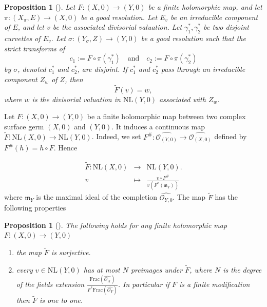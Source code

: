 \documentclass[reqno,dvipsnames,12pt]{amsart}
\newtheorem{prop}[thm]{Proposition}
\newtheorem{rema}[thm]{Remark}
\begin{document}
\begin{prop}[{\cite[Proposition 5.7]{yenni1}}]\label{imagedivisorialvaluation}
Let $F:(X,0) \to (Y,0)$ be a finite holomorphic map, and let $\pi:(X_\pi,E)\to (X,0)$ be a good resolution. Let $E_v$ be an irreducible component of $E$, and let $v$ be the associated divisorial valuation. Let $\gamma_1^*,\gamma_2^*$ be two disjoint curvettes of $E_v$. Let $\sigma:(Y_\sigma,Z)\to (Y,0)$ be a good resolution such that the strict transforms of
\[
c_1 := F \circ \pi(\gamma_1^*) \quad\text{and}\quad c_2 := F \circ \pi(\gamma_2^*)
\]
by $\sigma$, denoted $c_1^*$ and $c_2^*$, are disjoint. If $c_1^*$ and $c_2^*$ pass through an irreducible component $Z_w$ of $Z$, then
\[
\widetilde{F}(v) = w,
\]
where $w$ is the divisorial valuation in $\mathrm{NL}(Y,0)$ associated with $Z_w$.
\end{prop}

    
 Let $F: (X,0) \longrightarrow (Y,0)$ be a finite holomorphic map between two complex surface germ $(X,0)$ and $(Y,0)$. It induces a continuous map $\widetilde{F} : \mathrm{NL}(X,0) \longrightarrow \mathrm{NL}(Y,0)$. Indeed, we set
$F^{\#}:\widehat{ \mathcal{O}_{(Y,0)}} \longrightarrow \widehat{ \mathcal{O}_{(X,0)}}$ defined by  $F^{\#} (h)=h \circ F$. Hence


$$  \begin{array}{rcl}
\widetilde{F}:\mathrm{NL}(X,0)&\to&  \mathrm{NL}(Y,0).\\
v &\mapsto & \frac{v \circ F^{\#}}{v(F^*(\mathfrak{m}_Y))}
\end{array} $$ where $\mathfrak{m}_Y$ is the maximal ideal of the completion $\widehat{\mathcal{O}_{Y,0}}$. The map $\tilde{F}$ has the following properties
\begin{prop}[{\cite[Proposition 4.4]{GignacRuggiero2017}}]\label{onetoonearchimede} 	  The following holds for any finite holomorphic map $F:(X,0) \longrightarrow (Y,0)$
	\begin{enumerate}
		\item the map $\tilde{F}$ is surjective.
		\item every $v \in \mathrm{NL}(Y,0)$ has at most $N$ preimages under $\tilde{F}$, where $N$ is the degree of the fields extension $\frac{\mathrm{Frac}(\widehat{\mathcal{O}_X})}{F^*\mathrm{Frac}(\widehat{\mathcal{O}_Y})}$. In particular if $F$ is a finite modification then $\tilde{F}$ is one to one.	\end{enumerate}
\end{prop}
\end{document}
